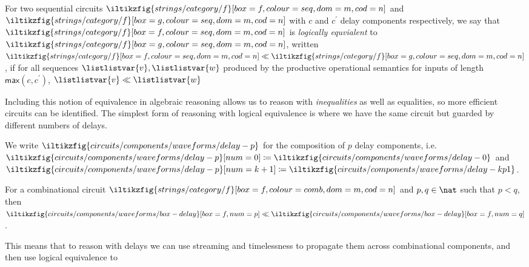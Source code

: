 \begin{definition}
    For two sequential circuits \(
    \iltikzfig{strings/category/f}[box=f,colour=seq,dom=m,cod=n]
    \) and \(
    \iltikzfig{strings/category/f}[box=g,colour=seq,dom=m,cod=n]
    \) with \(c\) and \(c^\prime\) delay components respectively, we say that \(
    \iltikzfig{strings/category/f}[box=f,colour=seq,dom=m,cod=n]
    \) is \emph{logically equvialent} to \(
    \iltikzfig{strings/category/f}[box=g,colour=seq,dom=m,cod=n]
    \), written \(
    \iltikzfig{strings/category/f}[box=f,colour=seq,dom=m,cod=n]
    \ll
    \iltikzfig{strings/category/f}[box=g,colour=seq,dom=m,cod=n]
    \), if for all sequences \(\listlistvar{v},\listlistvar{w}\) produced by the
    productive operational semantics for inputs of length
    \(\mathsf{max}(c,c^\prime)\),  \(\listlistvar{v} \ll \listlistvar{w}\)
\end{definition}

Including this notion of equivalence in algebraic reasoning allows us to reason
with \emph{inequalities} as well as equalities, so more efficient circuits can
be identified.
The simplest form of reasoning with logical equivalence is where we have the
same circuit but guarded by different numbers of delays.

\begin{notation}
    We write \(
    \iltikzfig{circuits/components/waveforms/delay-p}
    \) for the composition of \(p\) delay components, i.e.\ \(
    \iltikzfig{circuits/components/waveforms/delay-p}[num=0]
    \coloneqq
    \iltikzfig{circuits/components/waveforms/delay-0}
    \) and \(
    \iltikzfig{circuits/components/waveforms/delay-p}[num=k+1]
    \coloneqq
    \iltikzfig{circuits/components/waveforms/delay-kp1}
    \).
\end{notation}

\begin{lemma}
    For a combinational circuit \(
    \iltikzfig{strings/category/f}[box=f,colour=comb,dom=m,cod=n]
    \) and \(p,q \in \nat\) such that \(p < q\), then \(
    \iltikzfig{circuits/components/waveforms/box-delay}[box=f,num=p]
    \ll
    \iltikzfig{circuits/components/waveforms/box-delay}[box=f,num=q]
    \).
\end{lemma}

This means that to reason with delays we can use streaming and
timelessness to propagate them across combinational components, and then use
logical equivalence to

